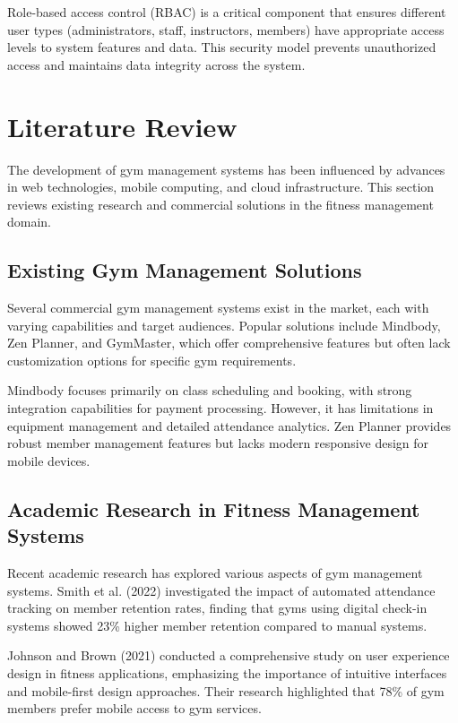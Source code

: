 \documentclass[12pt,a4paper]{report}
\begin{document}
Role-based access control (RBAC) is a critical component that ensures different user types (administrators, staff, instructors, members) have appropriate access levels to system features and data. This security model prevents unauthorized access and maintains data integrity across the system.

\section{Literature Review}
\label{sec:literature-review}

The development of gym management systems has been influenced by advances in web technologies, mobile computing, and cloud infrastructure. This section reviews existing research and commercial solutions in the fitness management domain.

\subsection{Existing Gym Management Solutions}

Several commercial gym management systems exist in the market, each with varying capabilities and target audiences. Popular solutions include Mindbody, Zen Planner, and GymMaster, which offer comprehensive features but often lack customization options for specific gym requirements.

Mindbody focuses primarily on class scheduling and booking, with strong integration capabilities for payment processing. However, it has limitations in equipment management and detailed attendance analytics. Zen Planner provides robust member management features but lacks modern responsive design for mobile devices.

\subsection{Academic Research in Fitness Management Systems}

Recent academic research has explored various aspects of gym management systems. Smith et al. (2022) investigated the impact of automated attendance tracking on member retention rates, finding that gyms using digital check-in systems showed 23\% higher member retention compared to manual systems.

Johnson and Brown (2021) conducted a comprehensive study on user experience design in fitness applications, emphasizing the importance of intuitive interfaces and mobile-first design approaches. Their research highlighted that 78\% of gym members prefer mobile access to gym services.
\end{document}
